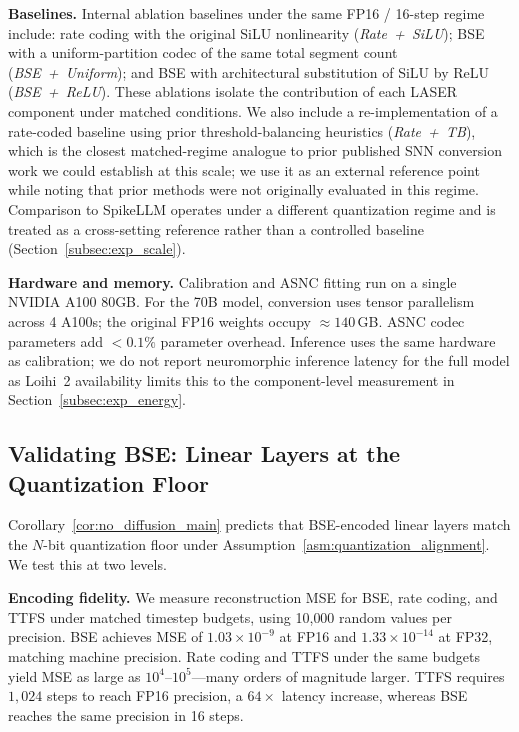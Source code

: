 \documentclass{article}
\theoremstyle{plain}
\theoremstyle{definition}
\theoremstyle{remark}
\begin{document}
\noindent\textbf{Baselines.}
Internal ablation baselines under the same FP16 / 16-step regime include: rate
coding with the original SiLU nonlinearity (\textit{Rate~+~SiLU}); BSE with a
uniform-partition codec of the same total segment count
(\textit{BSE~+~Uniform}); and BSE with architectural substitution of SiLU by
ReLU (\textit{BSE~+~ReLU}). These ablations isolate the contribution of each
LASER component under matched conditions. We also include a re-implementation
of a rate-coded baseline using prior threshold-balancing heuristics
(\textit{Rate~+~TB}), which is the closest matched-regime analogue to prior
published SNN conversion work we could establish at this scale; we use it as
an external reference point while noting that prior methods were not
originally evaluated in this regime. Comparison to SpikeLLM operates under a
different quantization regime and is treated as a cross-setting reference
rather than a controlled baseline (Section~\ref{subsec:exp_scale}).

\noindent\textbf{Hardware and memory.}
Calibration and ASNC fitting run on a single NVIDIA A100 80GB. For the 70B
model, conversion uses tensor parallelism across 4 A100s; the original FP16
weights occupy $\approx\!140$\,GB. ASNC codec parameters add $< 0.1\%$
parameter overhead. Inference uses the same hardware as calibration; we do
not report neuromorphic inference latency for the full model as Loihi~2
availability limits this to the component-level measurement in
Section~\ref{subsec:exp_energy}.


\subsection{Validating BSE: Linear Layers at the Quantization Floor}
\label{subsec:exp_bse}

Corollary~\ref{cor:no_diffusion_main} predicts that BSE-encoded linear layers
match the $N$-bit quantization floor under
Assumption~\ref{asm:quantization_alignment}. We test this at two levels.

\noindent\textbf{Encoding fidelity.}
We measure reconstruction MSE for BSE, rate coding, and TTFS under matched
timestep budgets, using 10{,}000 random values per precision.
BSE achieves MSE of $1.03 \times 10^{-9}$ at FP16 and $1.33 \times 10^{-14}$ at
FP32, matching machine precision. Rate coding and TTFS under the same budgets
yield MSE as large as $10^4$--$10^5$---many orders of magnitude larger. TTFS
requires $1{,}024$ steps to reach FP16 precision, a $64\times$ latency
increase, whereas BSE reaches the same precision in 16 steps.
\end{document}
